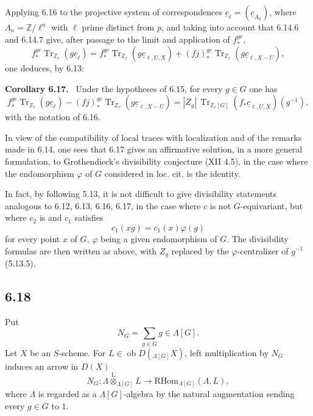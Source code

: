 \documentclass[11pt]{article}
\newenvironment{statement}[1]{\par\medskip\noindent\textbf{#1.}\ }{\par\medskip}
\providecommand{\RHom}{\mathrm{RHom}}
\providecommand{\Tr}{\operatorname{Tr}}
\providecommand{\Tr}{\operatorname{Tr}}
\providecommand{\lten}{\overset{\mathrm L}{\otimes}}
\providecommand{\Ob}{\operatorname{ob}}
\providecommand{\Tr}{\operatorname{Tr}}
\providecommand{\RHom}{\mathrm{RHom}}
\providecommand{\lten}{\overset{\mathrm L}{\otimes}}
\providecommand{\RHom}{\mathrm R\mathcal{H}om}
\providecommand{\lten}{\overset{\mathrm L}{\otimes}}
\providecommand{\Ob}{\operatorname{ob}}
\providecommand{\Tr}{\operatorname{Tr}}
\providecommand{\lten}{\overset{\mathrm L}{\otimes}}
\providecommand{\lten}{\overset{\mathrm L}{\otimes}}
\providecommand{\Ob}{\operatorname{Ob}}
\providecommand{\lten}{\overset{\mathrm L}{\otimes}}
\providecommand{\RHom}{\mathrm{RHom}}
\begin{document}
Applying 6.16 to the projective system of correspondences $\underline c_{\ell}=(\underline c_{\Lambda_n})$, where $\Lambda_n=\mathbb Z/\ell^n$ with $\ell$ prime distinct from $p$, and taking into account that 6.14.6 and 6.14.7 give, after passage to the limit and application of $f_*^{gc}$,
\[
f_*^{gc}\Tr_{\mathbb Z_{\ell}}(g\underline c_{\ell})
=
f_*^{gc}\Tr_{\mathbb Z_{\ell}}(g\underline c_{\ell,U,X})
+(fj)_*^{gc}\Tr_{\mathbb Z_{\ell}}(g\underline c_{\ell,X-U}),
\]
one deduces, by 6.13:

\begin{statement}{Corollary 6.17}
Under the hypotheses of 6.15, for every $g\in G$ one has
\begin{equation}
f_*^{gc}\Tr_{\mathbb Z_{\ell}}(g\underline c_{\ell})
-(fj)_*^{gc}\Tr_{\mathbb Z_{\ell}}(g\underline c_{\ell,X-U})
=
|Z_g|\,\Tr_{\mathbb Z_{\ell}[G]}(f_*\underline c_{\ell,U,X})(g^{-1}),
\tag{6.17.1}
\end{equation}
with the notation of 6.16.
\end{statement}

In view of the compatibility of local traces with localization and of the remarks made in 6.14, one sees that 6.17 gives an affirmative solution, in a more general formulation, to Grothendieck's divisibility conjecture (XII 4.5), in the case where the endomorphism $\varphi$ of $G$ considered in loc. cit. is the identity.

In fact, by following 5.13, it is not difficult to give divisibility statements analogous to 6.12, 6.13, 6.16, 6.17, in the case where $c$ is not $G$-equivariant, but where $c_2$ is and $c_1$ satisfies
\[
c_1(xg)=c_1(x)\varphi(g)
\]
for every point $x$ of $G$, $\varphi$ being a given endomorphism of $G$. The divisibility formulas are then written as above, with $Z_g$ replaced by the $\varphi$-centralizer of $g^{-1}$ (5.13.5).

\subsection*{6.18}
Put
\begin{equation}
N_G=\sum_{g\in G} g\in\Lambda[G].
\tag{6.18.1}
\end{equation}
Let $X$ be an $S$-scheme. For $L\in\Ob D({}_{\Lambda[G]}X)$, left multiplication by $N_G$ induces an arrow in $D(X)$
\begin{equation}
N_G:\Lambda\lten_{\Lambda[G]}L
\longrightarrow
\RHom_{\Lambda[G]}(\Lambda,L),
\tag{6.18.2}
\end{equation}
where $\Lambda$ is regarded as a $\Lambda[G]$-algebra by the natural augmentation sending every $g\in G$ to $1$.
\end{document}
